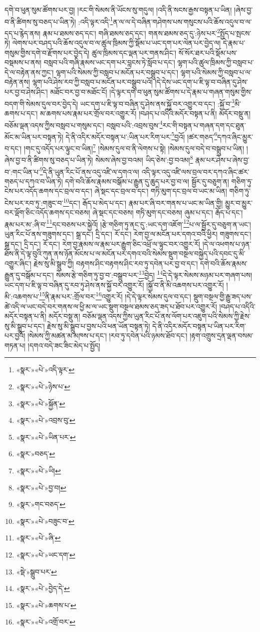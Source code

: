 དགེ་བ་ཕུན་སུམ་ཚོགས་པར་བྱ། །རང་གི་སེམས་ནི་ཡོངས་སུ་གདུལ། །འདི་ནི་སངས་རྒྱས་བསྟན་པ་ཡིན། །ཞེས་བྱ་བ་ནི་ཚིགས་སུ་བཅད་པ་ཡིན་ཏེ། :འདི་ལྟར་འདི་\footnote{«སྣར་»«པེ་»འདི་ལྟར་}ན་ལ་ལ་དེ་བཞིན་གཤེགས་པས་གསུངས་པའི་ཆོས་འདུལ་བ་ལ་དད་པ་རྙེད་ནས། རྣམ་པ་ཐམས་ཅད་དང་། གཞི་ཐམས་ཅད་དང་། གནས་ཐམས་ཅད་དུ་:ཉེས་པར་\footnote{«སྣར་»«པེ་»ཉེས་པ་}སྤྱོད་པ་སྤངས་ཏེ། ལེགས་པར་བཤད་པའི་ཆོས་འདུལ་བ་ལ་ཚུལ་ཁྲིམས་ཀྱི་སྡོམ་པ་ཡང་དག་པར་ལེན་པར་བྱེད་ལ། དེ་རྣམ་པ་གསུམ་གྱིས་དགེ་བ་རྫོགས་པར་བྱེད་དེ། ཚུལ་ཁྲིམས་དང་ལྡན་པར་གནས་ཤིང་། སོ་སོར་ཐར་པའི་སྡོམ་པས་བསྡམས་པ་ནས། བསླབ་པའི་གཞི་རྣམས་ཡང་དག་པར་བླངས་ཏེ་སློབ་པ་དང་། ལྷག་པའི་ཚུལ་ཁྲིམས་ཀྱི་བསླབ་པ་དེ་ལ་བརྟེན་ནས་ཀྱང་། ལྷག་པའི་སེམས་ཀྱི་བསླབ་པ་མངོན་པར་བསྒྲུབ་པ་དང་། ལྷག་པའི་སེམས་ཀྱི་བསླབ་པ་ལ་བརྟེན་ནས། ལྷག་པའི་ཤེས་རབ་ཀྱི་བསླབ་པ་མངོན་པར་བསྒྲུབ་པའོ། །དེ་དེས་ཡང་དག་པ་ཇི་ལྟ་བ་བཞིན་དུ་ཤེས་པར་བྱ་བ་ཤེས་ཤིང་། མཐོང་བར་བྱ་བ་མཐོང་ངོ། །དེ་ལྟར་དགེ་བ་ཕུན་སུམ་ཚོགས་པ་དེ་རྣམ་པ་གཞན་གསུམ་གྱིས་བདག་གི་སེམས་དུལ་བར་བྱེད་དེ། ཡང་དག་པ་ཇི་ལྟ་བ་བཞིན་དུ་ཤེས་ནས་སྐྱོ་བར་འགྱུར་བ་དང་། :སྐྱོ་བ་\footnote{«སྣར་»«པེ་»སྐྱོན་}མི་ཆགས་པ་དང་། མ་ཆགས་པས་རྣམ་པར་གྲོལ་བར་འགྱུར་རོ། །བཤད་པ་འདིའི་མདོར་བསྟན་པ་ནི། མདོར་བསྡུ་ན། བཅོམ་ལྡན་འདས་ཀྱིས་བསླབ་པ་གསུམ་དང་། བསླབ་པའི་:འབྲས་བུས་\footnote{«སྣར་»«པེ་»འབྲས་བུ་}རང་གི་བསྟན་པ་གཞན་དག་དང་ཐུན་མོང་མ་ཡིན་པར་བསྟན་ཏེ། དེ་ནི་འདིར་མདོར་བསྟན་པ་:ཡིན་པར་རིག་པར་\footnote{«སྣར་»«པེ་»ཡིན་པར་}བྱའོ། །ཚར་གཅད་\footnote{«སྣར་»བཅད་}དཀའ་ཞིང་མྱུར་བ་དང་། །གང་དུ་འདོད་པར་ལྟུང་བ་ཡིན།\footnote{«སྣར་»«པེ་»ཡི།} །སེམས་དུལ་བ་ནི་ལེགས་པ་སྟེ། །སེམས་དུལ་བདེ་བ་བསྒྲུབ་པ་ཡིན། །ཞེས་བྱ་བ་ནི་ཚིགས་སུ་བཅད་པ་ཡིན་ཏེ། སེམས་ཞེས་བྱ་བའམ། ཡིད་ཅེས་:བྱ་བའམ།\footnote{«སྣར་»«པེ་»བྱ་བ།} རྣམ་པར་ཤེས་པ་ཞེས་བྱ་བ་:གང་ཡིན་པ་\footnote{«སྣར་»གང་བཅད་}དེ་ནི་ཡུན་རིང་པོ་ནས་འདུ་འཛི་ལ་དགའ་ལ། འདི་ལྟར་འདུ་འཛི་ལས་བྲལ་བར་དཀའ་ཞིང་ཚར་གཅད་པ་དཀའ་བ་ཡིན་ཏེ། དགེ་བའི་ཆོས་རྣམས་བསྒོམ་པ་རྒྱུན་དུ་ཆུད་པར་བྱ་བ་ལ། སྦྱོར་དུ་བཅུག་ན། གཅིག་ཏུ་ངེས་པར་འདོད་ཆགས་དང་བྲལ་བ་དང་། ཞེ་སྡང་དང་བྲལ་བ་དང་། གཏི་མུག་དང་བྲལ་བ་ཡང་མ་ཡིན། གཅིག་ཏུ་ངེས་པར་རབ་ཏུ་:གཟུང་བ་\footnote{«སྣར་»«པེ་»བཟུང་བ་}དང་། རྒོད་པ་མེད་པ་དང་། རྣམ་པར་ཞི་བར་གནས་པ་ཡང་མ་ཡིན་གྱི། མྱུར་བ་མྱུར་བར་ལྡོག་ཅིང་འདོད་ཆགས་དང་བཅས། ཞེ་སྡང་དང་བཅས། གཏི་མུག་དང་བཅས། ཞུམ་པ་དང་། རྒོད་པ་དང་། རྣམ་པར་མ་:ཞི་བ་\footnote{«སྣར་»«པེ་»ཞི་}དང་བཅས་པར་སྐྱེའོ། །རྩེ་གཅིག་ཏུ་ནང་དུ་:ཡང་དག་འཇོག་\footnote{«སྣར་»«པེ་»ཡང་དག་}པ་ལ་སྦྱོར་དུ་བཅུག་ན་ཡང་། ཡུན་རིང་པོ་ནས་གཟུགས་དང་། སྒྲ་དང་། དྲི་དང་། རོ་དང་། རེག་བྱ་ལ་མངོན་པར་དགའ་བའི་ཕྱིར། གཟུགས་དང་། སྒྲ་དང་། དྲི་དང་། རོ་དང་། རེག་བྱ་རྣམས་ལ་རྣམ་པར་རྒྱུག་ཅིང་འཕྲོ་ལ་ལྟུང་བར་འགྱུར་རོ། །དེ་ལ་འཕགས་པ་ཉན་ཐོས་ནི་དེ་ལྟ་བུའི་ཀུན་ནས་ཉོན་མོངས་པ་ལ་མངོན་པར་དགའ་བའི་སེམས་སྡུག་བསྔལ་བསྐྱེད་པའི་དབང་དུ་མི་འགྱུར་ཞིང་། རྗེས་སུ་མི་སྒྲུབ་ཀྱི། བརྟགས་ཤིང་བརྟགས་ཤིང་རབ་ཏུ་དབེན་པར་བྱ་བ་དང་། དགེ་བའི་ཆོས་རྣམས་རྒྱུན་དུ་བསྒོམ་པ་དང་། སེམས་རྩེ་གཅིག་ཏུ་བྱ་བ་:བསྒྲུབ་པར་\footnote{«སྡེ་»སྒྲུབ་པར་}བྱེད། \footnote{«སྣར་»«པེ་»བྱེད་དེ་}དེ་དེ་ལྟར་སེམས་མཉམ་པར་གཞག་པས། ཡང་དག་པ་ཇི་ལྟ་བ་བཞིན་དུ་རབ་ཏུ་ཤེས་ནས་སྐྱོ་བར་འགྱུར་རོ། །སྐྱོ་བ་ནི་མི་འཆགས་པར་འགྱུར་རོ། །མི་:འཆགས་པ་\footnote{«སྣར་»«པེ་»ཆགས་པ་}ནི་རྣམ་པར་:གྲོལ་བར་\footnote{«སྣར་»«པེ་»འགྲོ་བར་}འགྱུར་རོ། །དེ་དེ་ལྟར་སེམས་དུལ་བ་དང་། སྡུག་བསྔལ་གྱི་རྒྱུ་ཟད་པས་ཚེ་འདི་ལ་ཡང་བདེ་བར་གནས་ལ་ཕྱི་མ་ལ་ཡང་སྡུག་བསྔལ་ཐམས་ཅད་ཟད་པ་ཐོབ་པར་འགྱུར་རོ། །བཤད་པ་འདིའི་མདོར་བསྟན་པ་ནི། མདོར་བསྡུ་ན། བཅོམ་ལྡན་འདས་ཀྱིས་ཡུན་རིང་པོ་ནས་ལོག་པར་འཇུག་པའི་སེམས་ཀྱི་རྗེས་སུ་མི་སྒྲུབ་པ་དང་། རྗེས་སུ་མི་སྒྲུབ་པ་བྱས་པའི་ཕན་ཡོན་བསྟན་ཏེ། དེ་ནི་འདིར་མདོར་བསྟན་པ་ཡིན་པར་རིག་པར་བྱའོ། །སེམས་ཀྱི་མཚན་མ་མཁས་པ་དང་། །རབ་ཏུ་དབེན་པའི་ཉམས་ཐོབ་དང་། །རྟག་འགྲུས་དྲན་ལྡན་བསམ་གཏན་པ། །དགའ་བདེ་ཟང་ཟིང་མེད་པ་སྤྱོད། 